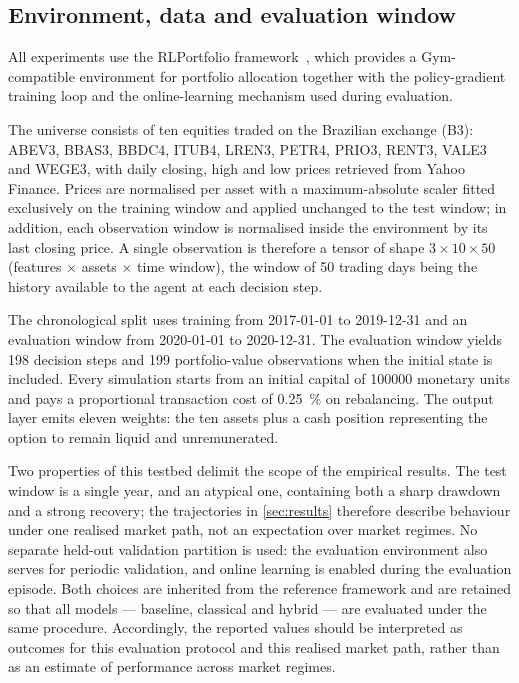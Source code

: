 \documentclass[aps,floatfix,superscriptaddress,twocolumn,tightenlines,amsmath,amssymb,nofootinbib,10pt,longbibliography,prl]{revtex4-2}
\begin{document}
\subsection{Environment, data and evaluation window}
\label{subsec:dataset}

All experiments use the RLPortfolio framework~\cite{RLportfolio}, which provides a
Gym-compatible environment for portfolio allocation together with the policy-gradient
training loop and the online-learning mechanism used during evaluation.

The universe consists of ten equities traded on the Brazilian exchange (B3): ABEV3, BBAS3,
BBDC4, ITUB4, LREN3, PETR4, PRIO3, RENT3, VALE3 and WEGE3, with daily closing, high and low
prices retrieved from Yahoo Finance. Prices are normalised per asset with a maximum-absolute
scaler fitted exclusively on the training window and applied unchanged to the test window;
in addition, each observation window is normalised inside the environment by its last
closing price. A single observation is therefore a tensor of shape
$3 \times 10 \times 50$ (features $\times$ assets $\times$ time window), the
window of \num{50} trading days being the history available to the agent at each decision
step.

The chronological split uses training from 2017-01-01 to 2019-12-31 and an evaluation window
from 2020-01-01 to 2020-12-31. The evaluation window yields
\num{198} decision steps and \num{199} portfolio-value observations when the
initial state is included. Every simulation starts from an initial capital of
\num{100000} monetary units and pays a proportional transaction cost of
\SI{0.25}{\percent} on rebalancing. The output layer emits eleven weights: the ten
assets plus a cash position representing the option to remain liquid and unremunerated.

Two properties of this testbed delimit the scope of the empirical results. The test window
is a single year, and an atypical one, containing both a sharp drawdown and a strong
recovery; the trajectories in \ref{sec:results} therefore describe behaviour under one
realised market path, not an expectation over market regimes. No separate held-out
validation partition is used: the evaluation environment also serves for periodic
validation, and online learning is enabled during the evaluation episode. Both choices are
inherited from the reference framework and are retained so that all models --- baseline,
classical and hybrid --- are evaluated under the same procedure. Accordingly, the reported
values should be interpreted as outcomes for this evaluation protocol and this realised
market path, rather than as an estimate of performance across market regimes.
\end{document}
